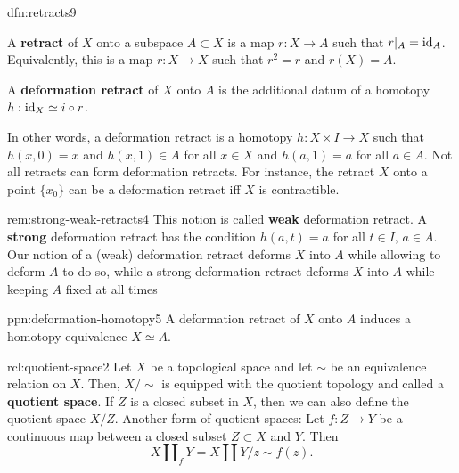 \documentclass[landscape, 8pt]{extarticle}
\begin{document}
\begin{multicols*}{3}
\begin{dfn}{dfn:retracts}{9}
	\begin{itemize-zero}
	    \item A \textbf{retract} of $X$ onto a subspace $A \subset X$ is a map $r : X \to A$ such that $r \rvert_{A} = \operatorname{id}_{A}$. Equivalently, this is a map $r : X \to X$ such that $r^{2} = r$ and $r(X) = A$.
	    \item A \textbf{deformation retract} of $X$ onto $A$ is the additional datum of a homotopy $h : \operatorname{id}_{X} \simeq i \circ r$.
	\end{itemize-zero}
	In other words, a deformation retract is a homotopy $h : X \times I \to X$ such that $h(x, 0) = x$ and $h(x, 1) \in A$ for all $x\in X$ and $h(a, 1) = a$ for all $a\in A$. Not all retracts can form deformation retracts. For instance, the retract $X$ onto a point $\{x_{0}\}$ can be a deformation retract iff $X$ is contractible.
\end{dfn}

\begin{rem}{rem:strong-weak-retracts}{4}
	This notion is called \textbf{weak} deformation retract. A \textbf{strong} deformation retract has the condition $h(a, t) = a$ for all $t\in I,\, a\in A$. Our notion of a (weak) deformation retract deforms $X$ into $A$ while allowing to deform $A$ to do so, while a strong deformation retract deforms $X$ into $A$ while keeping $A$ fixed at all times
\end{rem}

\begin{ppn}{ppn:deformation-homotopy}{5}
	A deformation retract of $X$ onto $A$ induces a homotopy equivalence $X \simeq A$.
\end{ppn}

\begin{rcl}{rcl:quotient-space}{2}
	Let $X$ be a topological space and let $\sim$ be an equivalence relation on $X$. Then, $X / \sim$ is equipped with the quotient topology and called a \textbf{quotient space}. If $Z$ is a closed subset in $X$, then we can also define the quotient space $X / Z$.
	\tcbline
	Another form of quotient spaces: Let $f : Z \to Y$ be a continuous map between a closed subset $Z \subset X$ and $Y$. Then
	\[X \amalg_{f} Y = X \amalg Y /z \sim f(z).\]
\end{rcl}


\end{multicols*}
\end{document}
